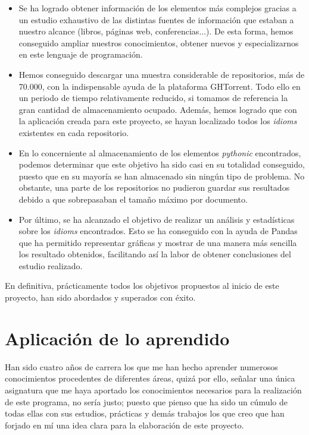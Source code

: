 \documentclass[a4paper, 12pt]{book}
\begin{document}
\begin{itemize}
\item Se ha logrado obtener información de los elementos más complejos gracias a un estudio exhaustivo de las distintas fuentes de información que estaban a nuestro alcance (libros, páginas web, conferencias...). De esta forma, hemos conseguido ampliar nuestros conocimientos, obtener nuevos y especializarnos en este lenguaje de programación.

\item Hemos conseguido descargar una muestra considerable de repositorios, más de 70.000, con la indispensable ayuda de la plataforma GHTorrent. Todo ello en un periodo de tiempo relativamente reducido, si tomamos de referencia la gran cantidad de almacenamiento ocupado. Además, hemos logrado que con la aplicación creada para este proyecto, se hayan localizado todos los \textit{idioms} existentes en cada repositorio.

\item En lo concerniente al almacenamiento de los elementos \textit{pythonic} encontrados, podemos determinar que este objetivo ha sido casi en su totalidad conseguido, puesto que en su mayoría se han almacenado sin ningún tipo de problema. No obstante, una parte de los repositorios no pudieron guardar sus resultados debido a que sobrepasaban el tamaño máximo por documento.

\item Por último, se ha alcanzado el objetivo de realizar un análisis y estadísticas sobre los \textit{idioms} encontrados. Esto se ha conseguido con la ayuda de Pandas que ha permitido representar gráficas y mostrar de una manera más sencilla los resultado obtenidos, facilitando así la labor de obtener conclusiones del estudio realizado.

\end{itemize}

En definitiva, prácticamente todos los objetivos propuestos al inicio de este proyecto, han sido abordados y superados con éxito.

\section{Aplicación de lo aprendido}
\label{sec:aplicacion}

Han sido cuatro años de carrera los que me han hecho aprender numerosos conocimientos procedentes de diferentes áreas, quizá por ello, señalar una única asignatura que me haya aportado los conocimientos necesarios para la realización de este programa, no sería justo; puesto que pienso que ha sido un cúmulo de todas ellas con sus estudios, prácticas y demás trabajos los que creo que han forjado en mí una idea clara para la elaboración de este proyecto.
\end{document}
